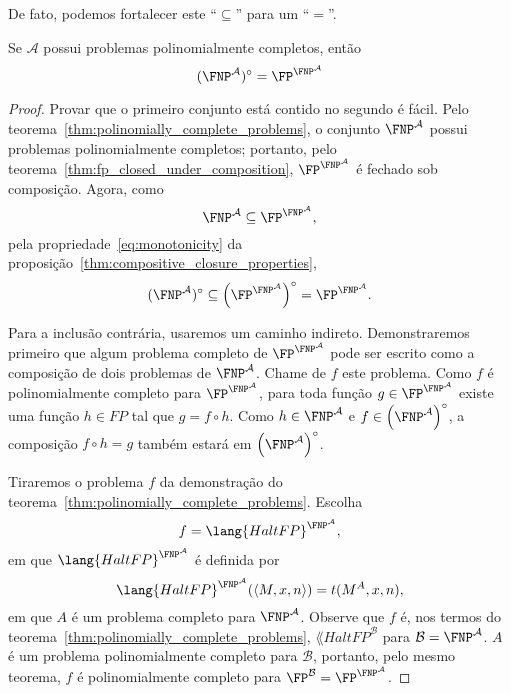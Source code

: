 De fato,
podemos fortalecer este ``$\subseteq$'' para um ``$=$''.

\begin{theorem}
    Se $\mathcal A$ possui problemas polinomialmente completos,
    então
    \begin{equation*}
        (\FNP^\mathcal A)^\circ = \FP^{\FNP^\mathcal A}
    \end{equation*}
    \label{thm:compositive_closure}
\end{theorem}

\begin{proof}
    Provar que o primeiro conjunto está contido no segundo é fácil.
    Pelo teorema~\ref{thm:polinomially_complete_problems},
    o conjunto $\FNP^\mathcal A$
    possui problemas polinomialmente completos;
    portanto,
    pelo teorema~\ref{thm:fp_closed_under_composition},
    $\FP^{\FNP^\mathcal A}$ é fechado sob composição.
    Agora, como
    \begin{equation*}
        \FNP^\mathcal A \subseteq \FP^{\FNP^\mathcal A},
    \end{equation*}
    pela propriedade~\ref{eq:monotonicity}
    da proposição~\ref{thm:compositive_closure_properties},
    \begin{equation*}
        (\FNP^\mathcal A)^\circ \subseteq
            \left(\FP^{\FNP^\mathcal A}\right)^\circ
            = \FP^{\FNP^\mathcal A}.
    \end{equation*}

    Para a inclusão contrária,
    usaremos um caminho indireto.
    Demonstraremos primeiro que algum problema completo de
    $\FP^{\FNP^\mathcal A}$
    pode ser escrito como a composição de dois problemas de $\FNP^\mathcal A$.
    Chame de $f$ este problema.
    Como $f$ é polinomialmente completo para $\FP^{\FNP^\mathcal A}$,
    para toda função $g \in \FP^{\FNP^\mathcal A}$ existe uma função $h \in FP$
    tal que $g = f \circ h$.
    Como $h \in \FNP^\mathcal A$ e $f \in \left(\FNP^\mathcal A\right)^\circ$,
    a composição $f \circ h = g$
    também estará em $\left(\FNP^\mathcal A\right)^\circ$.

    Tiraremos o problema $f$
    da demonstração do teorema~\ref{thm:polinomially_complete_problems}.
    Escolha
    \newcommand{\HaltFP}{{\lang{HaltFP}}}
    \begin{equation*}
        f = \HaltFP^{\FNP^\mathcal A},
    \end{equation*}
    em que $\HaltFP^{\FNP^\mathcal A}$ é definida por
    \begin{equation*}
        \HaltFP^{\FNP^\mathcal A}(\langle M, x, n \rangle) = t(M^A, x, n),
    \end{equation*}
    em que $A$ é um problema completo para $\FNP^\mathcal A$.
    Observe que $f$ é,
    nos termos do teorema~\ref{thm:polinomially_complete_problems},
    $\HaltFP^\mathcal B$
    para $\mathcal B = \FNP^\mathcal A$.
    $A$ é um problema polinomialmente completo para $\mathcal B$,
    portanto,
    pelo mesmo teorema,
    $f$ é polinomialmente completo para $\FP^\mathcal B = \FP^{\FNP^\mathcal A}$.


\end{proof}
